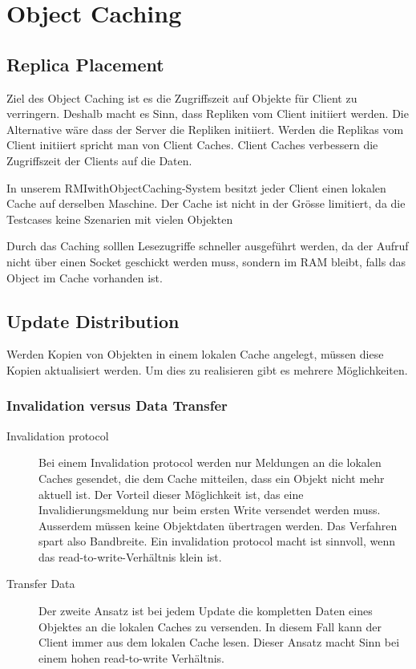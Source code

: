 \chapter{Object Caching}

\label{sec:object-caching}

\section{Replica Placement}
\label{sec:replica-management}

Ziel des Object Caching ist es die Zugriffszeit auf Objekte für Client zu verringern. Deshalb macht es Sinn, dass Repliken vom Client initiiert werden. Die Alternative wäre dass der Server die Repliken initiiert. Werden die Replikas vom Client initiiert spricht man von Client Caches. Client Caches verbessern die Zugriffszeit der Clients auf die Daten.

In unserem RMIwithObjectCaching-System besitzt jeder Client einen lokalen Cache auf derselben Maschine. Der Cache ist nicht in der Grösse limitiert, da die Testcases keine Szenarien mit vielen Objekten 

Durch das Caching solllen Lesezugriffe schneller ausgeführt werden, da der Aufruf nicht über einen Socket geschickt werden muss, sondern im RAM bleibt, falls das Object im Cache vorhanden ist.

\section{Update Distribution}
\label{sec:update-distribution}

Werden Kopien von Objekten in einem lokalen Cache angelegt, müssen diese Kopien aktualisiert werden. Um dies zu realisieren gibt es mehrere Möglich\-keiten.

\subsection{Invalidation versus Data Transfer}
\label{sec:inval-vers-data}

\begin{description}
\item[Invalidation protocol] Bei einem Invalidation protocol werden nur Meldungen an die lokalen Caches gesendet, die dem Cache mitteilen, dass ein Objekt nicht mehr aktuell ist. Der Vorteil dieser Möglichkeit ist, das eine Invalidierungsmeldung nur beim ersten Write versendet werden muss. Ausserdem müssen keine Objektdaten übertragen werden. Das Verfahren spart also Bandbreite. Ein invalidation protocol macht ist sinnvoll, wenn das read-to-write-Verhältnis klein ist.
\item[Transfer Data] Der zweite Ansatz ist bei jedem Update die kompletten Daten eines Objektes an die lokalen Caches zu versenden. In diesem Fall kann der Client immer aus dem lokalen Cache lesen. Dieser Ansatz macht Sinn bei einem hohen read-to-write Verhältnis.
\end{description}

